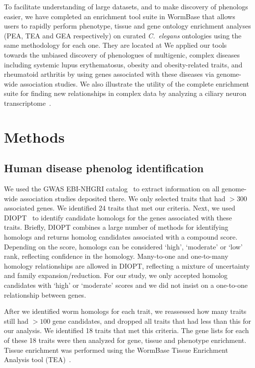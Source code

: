 \documentclass[10pt,letterpaper,twocolumn]{article}
\newcommand{\cel}{\emph{C.~elegans}}
\begin{document}
To facilitate understanding of large datasets, and to make discovery of
phenologs easier, we have completed an enrichment tool suite in WormBase
that allows users to rapidly perform phenotype, tissue and gene ontology
enrichment analyses (PEA, TEA and GEA respectively) on curated \cel{} ontologies
using the same methodology for each one. They are located at
We applied our tools towards the unbiased discovery of phenologues of
multigenic, complex diseases including
systemic lupus erythematosus, obesity and obesity-related traits,  and
rheumatoid arthritis
by using genes associated with these
diseases via genome-wide association studies. We also illustrate the utility of
the complete enrichment suite for finding new relationships in complex data by
analyzing a ciliary neuron transcriptome~\cite{}.

\section*{Methods}
\subsection*{Human disease phenolog identification}
We used the GWAS EBI-NHGRI catalog~\cite{} to extract information on all genome-wide
association studies deposited there. We only selected traits that had $>300$
associated genes. We identified 24 traits that met our criteria. Next, we used
DIOPT~\cite{} to identify candidate homologs for the genes associated with these
traits. Briefly, DIOPT combines a large number of methods for identifying homologs
and returns homolog candidates associated with a compound score. Depending on the score,
homologs can be considered `high', `moderate' or `low' rank, reflecting confidence
in the homology. Many-to-one and one-to-many homology relationships are allowed
in DIOPT, reflecting a mixture of uncertainty and family expansion/reduction.
For our study, we only accepted homolog candidates with `high' or `moderate' scores
and we did not insist on a one-to-one relationship between genes.

After we identified worm homologs for each trait, we reassessed how many traits
still had $>100$ gene candidates, and dropped all traits that had less than this
for our analysis. We identified 18 traits that met this criteria. The gene
lists for each of these 18 traits were then analyzed for gene, tissue and
phenotype enrichment. Tissue enrichment was performed using the WormBase Tissue
Enrichment Analysis tool (TEA)~\cite{}.
\end{document}
